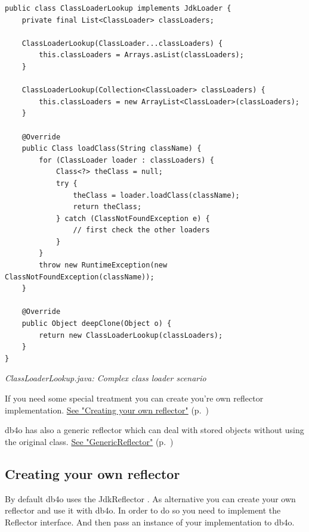 \begin{lstlisting}
public class ClassLoaderLookup implements JdkLoader {
    private final List<ClassLoader> classLoaders;

    ClassLoaderLookup(ClassLoader...classLoaders) {
        this.classLoaders = Arrays.asList(classLoaders);
    }

    ClassLoaderLookup(Collection<ClassLoader> classLoaders) {
        this.classLoaders = new ArrayList<ClassLoader>(classLoaders);
    }

    @Override
    public Class loadClass(String className) {
        for (ClassLoader loader : classLoaders) {
            Class<?> theClass = null;
            try {
                theClass = loader.loadClass(className);
                return theClass;
            } catch (ClassNotFoundException e) {
                // first check the other loaders
            }
        }
        throw new RuntimeException(new ClassNotFoundException(className));
    }

    @Override
    public Object deepClone(Object o) {
        return new ClassLoaderLookup(classLoaders);
    }
}
\end{lstlisting}

{\small\itshape ClassLoaderLookup.java: Complex class loader scenario\par}
\medskip

If you need some special treatment you can create you're own reflector implementation. \hyperref[ref:advanced-topics-db4o-reflection-api-creating-your-own-reflector]{See "Creating your own reflector"} (p.~\pageref{ref:advanced-topics-db4o-reflection-api-creating-your-own-reflector})

db4o has also a generic reflector which can deal with stored objects without using the original class. \hyperref[ref:advanced-topics-db4o-reflection-api-genericreflector]{See "GenericReflector"} (p.~\pageref{ref:advanced-topics-db4o-reflection-api-genericreflector})

\subsection{Creating your own reflector}
\label{ref:advanced-topics-db4o-reflection-api-creating-your-own-reflector}

By default db4o uses the JdkReflector . As alternative you can create your own reflector and use it with db4o. In order to do so you need to implement the Reflector interface. And then pass an instance of your implementation to db4o.

